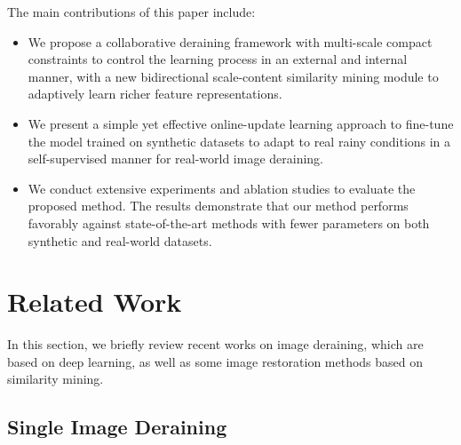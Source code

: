 \documentclass[letterpaper]{article} %
\begin{document}
The main contributions of this paper include:
\begin{itemize}
\item We propose a collaborative deraining framework with multi-scale compact constraints to control the learning process in an external and internal manner, with a new bidirectional scale-content similarity mining module to adaptively learn richer feature representations.

\item We present a simple yet effective online-update learning approach to fine-tune the model trained on synthetic datasets to adapt to real rainy conditions in a self-supervised manner for real-world image deraining.

\item We conduct extensive experiments and ablation studies to evaluate the proposed method. The results demonstrate that our method performs favorably against state-of-the-art methods with fewer parameters on both synthetic and real-world datasets.
\end{itemize}













\section{Related Work}
In this section, we briefly review recent works on image deraining, which are based on deep learning, as well as some image restoration methods based on similarity mining.
\subsection{Single Image Deraining}
\end{document}
